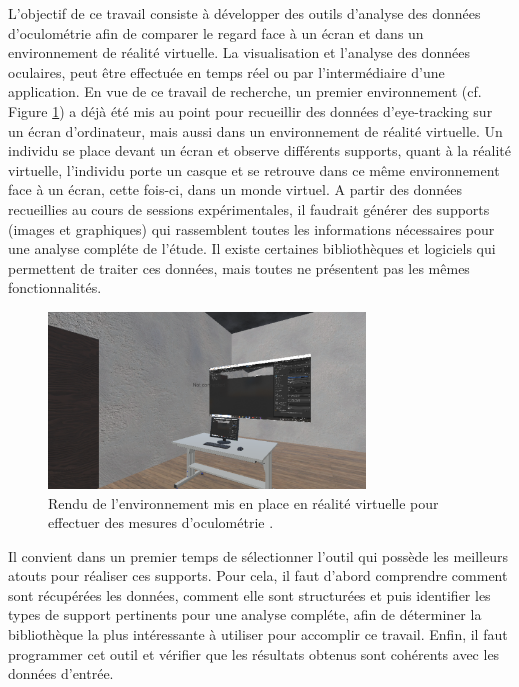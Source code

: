 \documentclass[hidelinks,12pt]{article}
\begin{document}
\bigskip
L'objectif de ce travail consiste à développer des outils d'analyse des données
d'oculométrie afin de comparer le regard face à un écran et dans un
environnement de réalité virtuelle. La visualisation et l'analyse des données
oculaires, peut être effectuée en temps réel ou par l'intermédiaire d'une
application. En vue de ce travail de recherche, un premier environnement (cf.
Figure \ref{fig:environnement}) a déjà été mis au point pour recueillir des
données d'eye-tracking sur un écran d'ordinateur, mais aussi dans un
environnement de réalité virtuelle. Un individu se place devant un écran et
observe différents supports, quant à la réalité virtuelle, l'individu porte un
casque et se retrouve dans ce même environnement face à un écran, cette fois-ci,
dans un monde virtuel. A partir des données recueillies au cours de sessions
expérimentales, il faudrait générer des supports (images et graphiques)
qui rassemblent toutes les informations nécessaires pour une analyse compléte de
l'étude. Il existe certaines bibliothèques et logiciels qui permettent de
traiter ces données, mais toutes ne présentent pas les mêmes fonctionnalités.

\begin{figure}[htpb]
  \centering
  \includegraphics[width=0.75\textwidth,keepaspectratio=true]{environnement.png}
  \caption{Rendu de l'environnement mis en place en réalité virtuelle pour
    effectuer des mesures d'oculométrie \cite{img_environnement}.}
  \label{fig:environnement}
\end{figure}

\bigskip
Il convient dans un premier temps de sélectionner l'outil qui possède les
meilleurs atouts pour réaliser ces supports. Pour cela, il faut d'abord
comprendre comment sont récupérées les données, comment elle sont structurées
et puis identifier les types de support pertinents pour une analyse compléte,
afin de déterminer la bibliothèque la plus intéressante à utiliser pour
accomplir ce travail. Enfin, il faut programmer cet outil et vérifier que les
résultats obtenus sont cohérents avec les données d'entrée.
\end{document}

